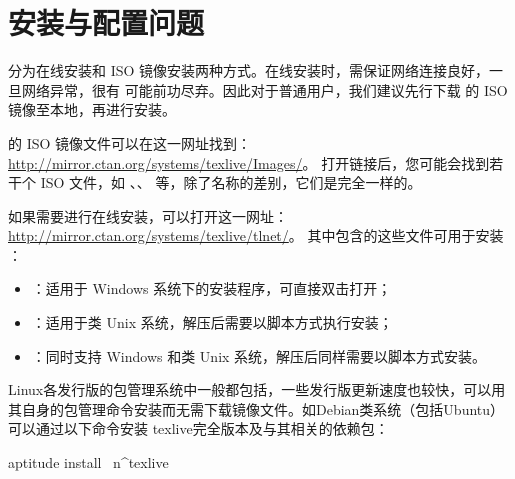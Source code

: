 %
%
%
%


\section{安装与配置问题}
\label{sec:install}


\TeXLive{} 分为在线安装和 ISO 镜像安装两种方式。在线安装时，需保证网络连接良好，一旦网络异常，很有
可能前功尽弃。因此对于普通用户，我们建议先行下载 \TeXLive{} 的 ISO 镜像至本地，再进行安装。

\TeXLive{} 的 ISO 镜像文件可以在这一网址找到：\url{http://mirror.ctan.org/systems/texlive/Images/}。
打开链接后，您可能会找到若干个 ISO 文件，如 、、
 等，除了名称的差别，它们是完全一样的。

如果需要进行在线安装，可以打开这一网址：\url{http://mirror.ctan.org/systems/texlive/tlnet/}。
其中包含的这些文件可用于安装 \TeXLive{}：

\begin{itemize}
  \item {}：适用于 Windows 系统下的安装程序，可直接双击打开；
  \item {}：适用于类 Unix 系统，解压后需要以脚本方式执行安装；
  \item {}：同时支持 Windows 和类 Unix 系统，解压后同样需要以脚本方式安装。
\end{itemize}

Linux各发行版的包管理系统中一般都包括\TeXLive{}，一些发行版更新速度也较快，可以用
其自身的包管理命令安装而无需下载镜像文件。如Debian类系统（包括Ubuntu）可以通过以下命令安装
texlive完全版本及与其相关的依赖包：
\begin{shcode}
aptitude install ~n^texlive
\end{shcode}


